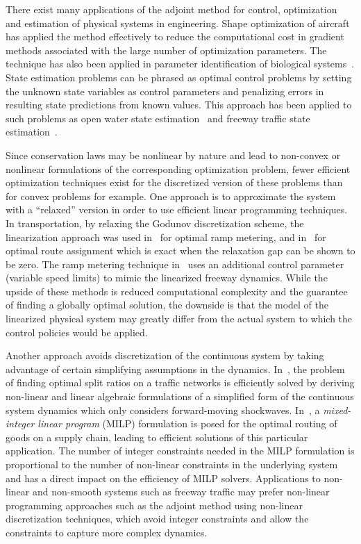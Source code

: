 There exist many applications of the adjoint method for control, optimization 
and estimation of physical systems in engineering. Shape optimization of 
aircraft~\cite{Reuther1996,Giles1997,Moin1994} has applied the method 
effectively to reduce the computational cost in gradient methods associated 
with the large number of optimization parameters. The technique has also been 
applied in parameter identification of biological systems~\cite{Raffard2008}. 
State estimation problems can be phrased as optimal control problems by setting 
the unknown state variables as control parameters and penalizing errors in 
resulting state predictions from known values. This approach has been applied 
to such problems as open water state estimation~\cite{Castaings2006,Strub2009} 
and freeway traffic state estimation~\cite{Jacqueta}.

Since conservation laws may be nonlinear by nature and lead to non-convex or 
nonlinear formulations of the corresponding optimization problem, fewer 
efficient optimization techniques exist for the 
discretized version of these problems than for convex problems for example. One 
approach is to approximate the system with a ``relaxed'' version in order to 
use efficient linear programming techniques. In transportation, by 
relaxing the Godunov discretization scheme, the linearization approach was used 
in~\cite{gomes2006optimal} for optimal ramp metering, and 
in~\cite{ziliaskopoulos2000linear} for optimal route assignment which is exact 
when the relaxation gap can be shown to be zero. The ramp 
metering technique in~\cite{Muralidharana} uses an additional control parameter 
(variable speed limits) to mimic the linearized freeway dynamics. While the 
upside of these methods is reduced computational complexity and the guarantee 
of finding a globally optimal solution, the downside is that the model of the 
linearized physical system may greatly differ from the actual system to which 
the control policies would be applied.

Another approach avoids discretization of the continuous system by taking advantage of certain simplifying assumptions in the dynamics. In~\cite{Fugenschuh2006Combinatorial}, the problem of finding optimal split ratios on a traffic networks is efficiently solved by deriving non-linear and linear algebraic formulations of a simplified form of the continuous system dynamics which only considers forward-moving shockwaves. In~\cite{Apice2010Modeling}, a \emph{mixed-integer linear program} (MILP) formulation is posed for the optimal routing of goods on a supply chain, leading to efficient solutions of this particular application. The number of integer constraints needed in the MILP formulation is proportional to the number of non-linear constraints in the underlying system and has a direct impact on the efficiency of MILP solvers. Applications to non-linear and non-smooth systems such as freeway traffic may prefer non-linear programming approaches such as the adjoint method using non-linear discretization techniques, which avoid integer constraints and allow the constraints to capture more complex dynamics.

